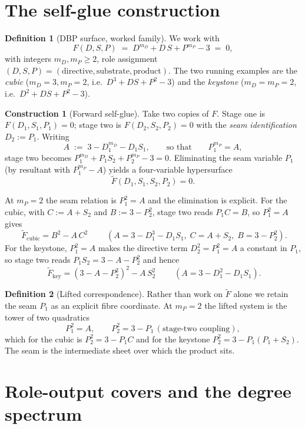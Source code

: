 \documentclass[11pt]{article}
\theoremstyle{plain}
\theoremstyle{definition}
\newtheorem{definition}{Definition}
\newtheorem{construction}{Construction}
\theoremstyle{remark}
\newcommand{\Ftil}{\widetilde{F}}
\begin{document}
\section{The self-glue construction}
\label{sec:construction}

\begin{definition}[DBP surface, worked family]
We work with
\[
  F(D,S,P) \;=\; D^{m_D} + D\,S + P^{m_P} - 3 \;=\; 0,
\]
with integers $m_D,m_P\ge 2$, role assignment $(D,S,P)=(\text{directive},
\text{substrate},\text{product})$. The two running examples are the
\emph{cubic} ($m_D=3,m_P=2$, i.e.\ $D^3+DS+P^2-3$) and the \emph{keystone}
($m_D=m_P=2$, i.e.\ $D^2+DS+P^2-3$).
\end{definition}

\begin{construction}[Forward self-glue]
\label{con:glue}
Take two copies of $F$. Stage one is $F(D_1,S_1,P_1)=0$; stage two is
$F(D_2,S_2,P_2)=0$ with the \emph{seam identification} $D_2:=P_1$. Writing
\[
  A \;:=\; 3 - D_1^{m_D} - D_1 S_1, \qquad\text{so that}\qquad P_1^{m_P}=A,
\]
stage two becomes $P_1^{m_D}+P_1 S_2 + P_2^{m_P}-3=0$. Eliminating the seam
variable $P_1$ (by resultant with $P_1^{m_P}-A$) yields a four-variable
hypersurface
\[
  \Ftil(D_1,S_1,S_2,P_2) = 0 .
\]
\end{construction}

\noindent At $m_P=2$ the seam relation is $P_1^2=A$ and the elimination is
explicit. For the cubic, with $C:=A+S_2$ and $B:=3-P_2^2$, stage two reads
$P_1 C = B$, so $P_1^2 = A$ gives
\[
  \boxed{\;\Ftil_{\text{cubic}} = B^2 - A\,C^2\;}\qquad (A = 3-D_1^3-D_1S_1,\; C=A+S_2,\; B=3-P_2^2).
\]
For the keystone, $P_1^2=A$ makes the directive term $D_2^2=P_1^2=A$ a constant in
$P_1$, so stage two reads $P_1 S_2 = 3-A-P_2^2$ and hence
\[
  \boxed{\;\Ftil_{\text{key}} = (3-A-P_2^2)^2 - A\,S_2^2\;}\qquad (A=3-D_1^2-D_1S_1).
\]

\begin{definition}[Lifted correspondence]
Rather than work on $\Ftil$ alone we retain the seam $P_1$ as an explicit fibre
coordinate. At $m_P=2$ the lifted system is the tower of two quadratics
\[
  P_1^2 = A, \qquad P_2^2 = 3 - P_1\,(\text{stage-two coupling}),
\]
which for the cubic is $P_2^2 = 3 - P_1 C$ and for the keystone $P_2^2 = 3 -
P_1(P_1+S_2)$. The seam is the intermediate sheet over which the product sits.
\end{definition}

\section{Role-output covers and the degree spectrum}
\label{sec:spectrum}
\end{document}
